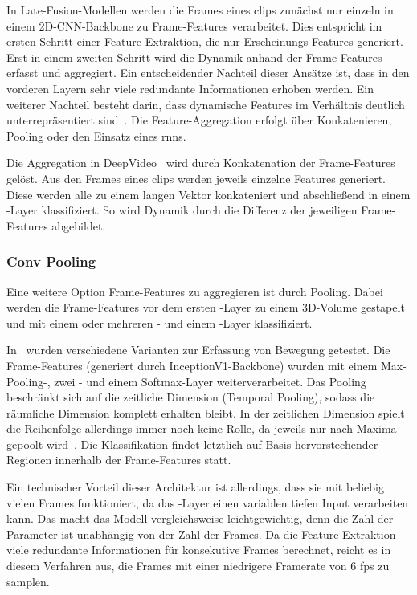 In Late-Fusion-Modellen werden die Frames eines \glspl{clip} zunächst nur einzeln in einem 2D-CNN-Backbone zu Frame-Features verarbeitet.
Dies entspricht im ersten Schritt einer Feature-Extraktion, die nur Erscheinungs-Features generiert.
Erst in einem zweiten Schritt wird die Dynamik anhand der Frame-Features erfasst und aggregiert.
Ein entscheidender Nachteil dieser Ansätze ist, dass in den vorderen Layern sehr viele redundante Informationen erhoben werden.
Ein weiterer Nachteil besteht darin, dass dynamische Features im Verhältnis deutlich unterrepräsentiert sind~\cite{Karpathy14}.
Die Feature-Aggregation erfolgt über Konkatenieren, Pooling oder den Einsatz eines \glspl{rnn}.

Die Aggregation in DeepVideo~\cite{Karpathy14} wird durch Konkatenation der Frame-Features gelöst.
Aus den Frames eines \glspl{clip} werden jeweils einzelne Features generiert.
Diese werden alle zu einem langen Vektor konkateniert und abschließend in einem \fc-Layer klassifiziert.
So wird Dynamik durch die Differenz der jeweiligen Frame-Features abgebildet.

\subsubsection{Conv Pooling}

Eine weitere Option Frame-Features zu aggregieren ist durch Pooling.
Dabei werden die Frame-Features vor dem ersten \fc-Layer zu einem 3D-Volume gestapelt und mit einem oder mehreren \pool- und einem \fc-Layer klassifiziert.

In~\cite{Ng15} wurden verschiedene Varianten zur Erfassung von Bewegung getestet.
Die Frame-Features (generiert durch InceptionV1-Backbone) wurden mit einem Max-Pooling-, zwei \fc- und einem Softmax-Layer weiterverarbeitet.
Das Pooling beschränkt sich auf die zeitliche Dimension (Temporal Pooling), sodass die räumliche Dimension komplett erhalten bleibt.
In der zeitlichen Dimension spielt die Reihenfolge allerdings immer noch keine Rolle, da jeweils nur nach Maxima gepoolt wird~\cite{Carreira17}.
Die Klassifikation findet letztlich auf Basis hervorstechender Regionen innerhalb der Frame-Features statt.


Ein technischer Vorteil dieser Architektur ist allerdings, dass sie mit beliebig vielen Frames funktioniert, da das \pool-Layer einen variablen tiefen Input verarbeiten kann.
Das macht das Modell vergleichsweise leichtgewichtig, denn die Zahl der Parameter ist unabhängig von der Zahl der Frames.
Da die Feature-Extraktion viele redundante Informationen für konsekutive Frames berechnet, reicht es in diesem Verfahren aus, die Frames mit einer niedrigere Framerate von 6 \gls{fps} zu samplen.


